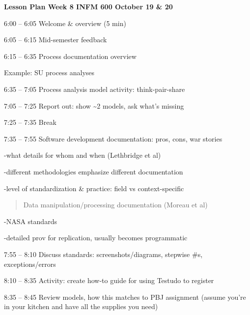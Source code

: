 \documentclass[]{article}
\date{}
\begin{document}
\textbf{Lesson Plan Week 8 INFM 600 October 19 \& 20 }

6:00 -- 6:05 Welcome \& overview (5 min)

6:05 -- 6:15 Mid-semester feedback

6:15 -- 6:35 Process documentation overview

Example: SU process analyses

6:35 -- 7:05 Process analysis model activity: think-pair-share

7:05 -- 7:25 Report out: show \textasciitilde{}2 models, ask what's
missing

7:25 -- 7:35 Break

7:35 -- 7:55 Software development documentation: pros, cons, war stories

-what details for whom and when (Lethbridge et al)

-different methodologies emphasize different documentation

-level of standardization \& practice: field vs context-specific

\begin{quote}
Data manipulation/processing documentation (Moreau et al)
\end{quote}

-NASA standards

-detailed prov for replication, usually becomes programmatic

7:55 -- 8:10 Discuss standards: screenshots/diagrams, stepwise \#s,
exceptions/errors

8:10 -- 8:35 Activity: create how-to guide for using Testudo to register

8:35 -- 8:45 Review models, how this matches to PBJ assignment (assume
you're in your kitchen and have all the supplies you need)
\end{document}

